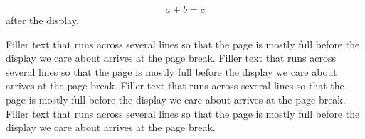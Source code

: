 \documentclass[10pt]{article}
\begin{document}
\begin{equation} a + b = c \end{equation}
after the display.

Filler text that runs across several lines so that the page is mostly full before the display we care about arrives at the page break. Filler text that runs across several lines so that the page is mostly full before the display we care about arrives at the page break. Filler text that runs across several lines so that the page is mostly full before the display we care about arrives at the page break. Filler text that runs across several lines so that the page is mostly full before the display we care about arrives at the page break.
\end{document}
